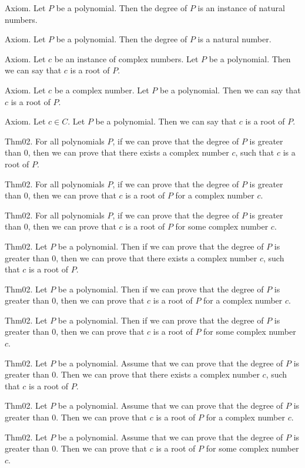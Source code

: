 \documentclass{article}
\begin{document}
Axiom. Let $P$ be a polynomial. Then the degree of $P$ is an instance of natural numbers.

Axiom. Let $P$ be a polynomial. Then the degree of $P$ is a natural number.

Axiom. Let $c$ be an instance of complex numbers. Let $P$ be a polynomial. Then we can say that $c$ is a root of $P$.

Axiom. Let $c$ be a complex number. Let $P$ be a polynomial. Then we can say that $c$ is a root of $P$.

Axiom. Let $c \in C$. Let $P$ be a polynomial. Then we can say that $c$ is a root of $P$.

Thm02. For all polynomials $P$, if we can prove that the degree of $P$ is greater than $0$, then we can prove that there exists a complex number $c$, such that $c$ is a root of $P$.

Thm02. For all polynomials $P$, if we can prove that the degree of $P$ is greater than $0$, then we can prove that $c$ is a root of $P$ for a complex number $c$.

Thm02. For all polynomials $P$, if we can prove that the degree of $P$ is greater than $0$, then we can prove that $c$ is a root of $P$ for some complex number $c$.

Thm02. Let $P$ be a polynomial. Then if we can prove that the degree of $P$ is greater than $0$, then we can prove that there exists a complex number $c$, such that $c$ is a root of $P$.

Thm02. Let $P$ be a polynomial. Then if we can prove that the degree of $P$ is greater than $0$, then we can prove that $c$ is a root of $P$ for a complex number $c$.

Thm02. Let $P$ be a polynomial. Then if we can prove that the degree of $P$ is greater than $0$, then we can prove that $c$ is a root of $P$ for some complex number $c$.

Thm02. Let $P$ be a polynomial. Assume that we can prove that the degree of $P$ is greater than $0$. Then we can prove that there exists a complex number $c$, such that $c$ is a root of $P$.

Thm02. Let $P$ be a polynomial. Assume that we can prove that the degree of $P$ is greater than $0$. Then we can prove that $c$ is a root of $P$ for a complex number $c$.

Thm02. Let $P$ be a polynomial. Assume that we can prove that the degree of $P$ is greater than $0$. Then we can prove that $c$ is a root of $P$ for some complex number $c$.
\end{document}
